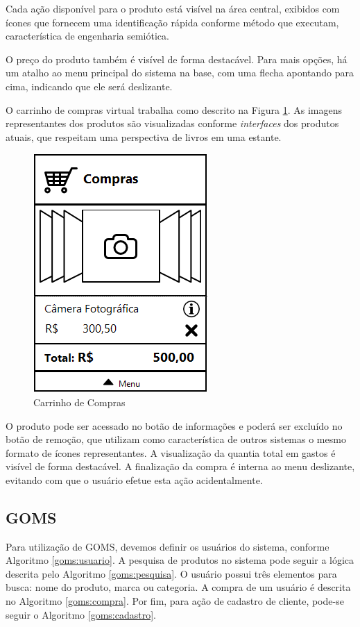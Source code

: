 \documentclass{article}
\begin{document}
Cada ação disponível para o produto está visível na área central, exibidos com
ícones que fornecem uma identificação rápida conforme método que executam,
característica de engenharia semiótica.

O preço do produto também é visível de forma destacável. Para mais opções, há um
atalho ao menu principal do sistema na base, com uma flecha apontando para cima,
indicando que ele será deslizante.


O carrinho de compras virtual trabalha como descrito na Figura \ref{fig:compra}.
As imagens representantes dos produtos são visualizadas conforme
\emph{interfaces} dos produtos atuais, que respeitam uma perspectiva de livros
em uma estante.

\begin{figure}[ht]
    \centering{}
    \includegraphics[scale=0.55]{images/compra.png}
    \caption{Carrinho de Compras}
    \label{fig:compra}
\end{figure}

O produto pode ser acessado no botão de informações e poderá ser excluído no
botão de remoção, que utilizam como característica de outros sistemas o mesmo
formato de ícones representantes. A visualização da quantia total em gastos é
visível de forma destacável. A finalização da compra é interna ao menu
deslizante, evitando com que o usuário efetue esta ação acidentalmente.

\subsection{GOMS}

Para utilização de GOMS, devemos definir os usuários do sistema, conforme
Algoritmo \ref{goms:usuario}. A pesquisa de produtos no sistema pode seguir a
lógica descrita pelo Algoritmo \ref{goms:pesquisa}. O usuário possui três
elementos para busca: nome do produto, marca ou categoria. A compra de um
usuário é descrita no Algoritmo \ref{goms:compra}. Por fim, para ação de
cadastro de cliente, pode-se seguir o Algoritmo \ref{goms:cadastro}.
\end{document}

